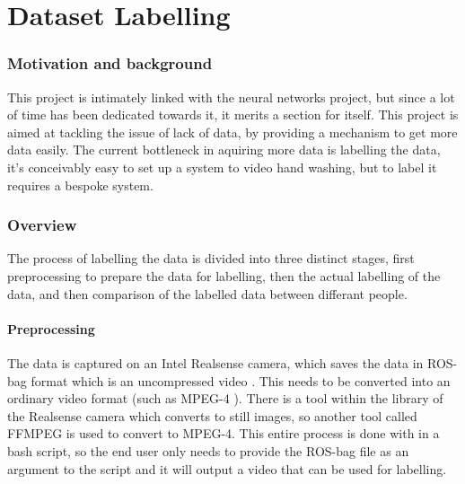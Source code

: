 \part{Dataset Labelling}
\section{Motivation and background}
This project is intimately linked with the neural networks project, but since a lot of time has been dedicated towards it, it merits a section for itself. This project is aimed at tackling the issue of lack of data, by providing a mechanism to get more data easily. The current bottleneck in aquiring more data is labelling the data, it's conceivably easy to set up a system to video hand washing, but to label it requires a bespoke system.

\section{Overview}
The process of labelling the data is divided into three distinct stages, first preprocessing to prepare the data for labelling, then the actual labelling of the data, and then comparison of the labelled data between differant people.
    \subsection{Preprocessing}
    The data is captured on an Intel Realsense camera, which saves the data in ROS-bag format which is an uncompressed video \cite{intelrosbag}. This needs to be converted into an ordinary video format (such as MPEG-4 \cite{wiegand2003overview}). There is a tool within the library of the Realsense camera which converts to still images, so another tool called FFMPEG \cite{ffmpeg} is used to convert to MPEG-4. This entire process is done with in a bash script, so the end user only needs to provide the ROS-bag file as an argument to the script and it will output a video that can be used for labelling.